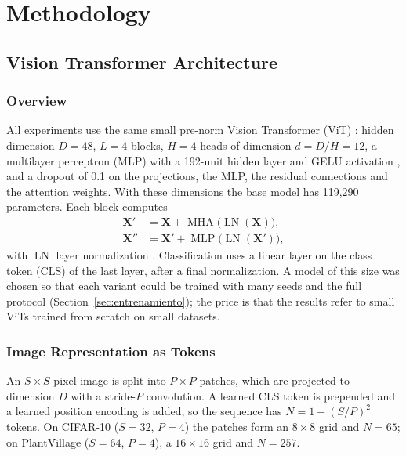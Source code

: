 \section{Methodology}
\label{sec:metodologia}

\subsection{Vision Transformer Architecture}
\label{sec:vit}

\subsubsection{Overview}
All experiments use the same small pre-norm Vision Transformer (ViT) \citep{dosovitskiy2021image}: hidden dimension $D=48$, $L=4$ blocks, $H=4$ heads of dimension $d=D/H=12$, a multilayer perceptron (MLP) with a 192-unit hidden layer and GELU activation \citep{hendrycks2016gelu}, and a dropout of 0.1 on the projections, the MLP, the residual connections and the attention weights. With these dimensions the base model has 119,290 parameters. Each block computes
\begin{align}
  \mathbf{X}' &= \mathbf{X} + \operatorname{MHA}\big(\operatorname{LN}(\mathbf{X})\big), \\
  \mathbf{X}'' &= \mathbf{X}' + \operatorname{MLP}\big(\operatorname{LN}(\mathbf{X}')\big),
\end{align}
with $\operatorname{LN}$ layer normalization \citep{ba2016layer}. Classification uses a linear layer on the class token (CLS) of the last layer, after a final normalization. A model of this size was chosen so that each variant could be trained with many seeds and the full protocol (Section~\ref{sec:entrenamiento}); the price is that the results refer to small ViTs trained from scratch on small datasets.

\subsubsection{Image Representation as Tokens}
An $S\times S$-pixel image is split into $P\times P$ patches, which are projected to dimension $D$ with a stride-$P$ convolution. A learned CLS token is prepended and a learned position encoding is added, so the sequence has $N = 1 + (S/P)^2$ tokens. On CIFAR-10 ($S=32$, $P=4$) the patches form an $8\times8$ grid and $N=65$; on PlantVillage ($S=64$, $P=4$), a $16\times16$ grid and $N=257$.

